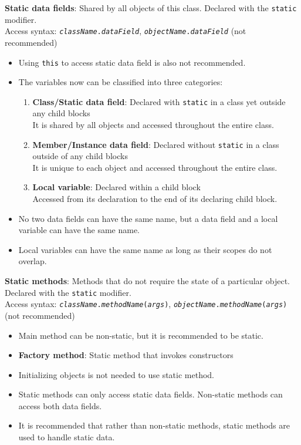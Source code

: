 \documentclass{article}
\begin{document}
\textbf{Static data fields}: Shared by all objects of this class. Declared with the \texttt{static} modifier.\\
Access syntax: \texttt{\textit{className}.\textit{dataField}}, \texttt{\textit{objectName}.\textit{dataField}} (not recommended)
\begin{itemize}
	\item Using \texttt{this} to access static data field is also not recommended.
	\item The variables now can be classified into three categories:
	\begin{enumerate}
		\item \textbf{Class/Static data field}: Declared with \texttt{static} in a class yet outside any child blocks\\
		It is shared by all objects and accessed throughout the entire class.
		\item \textbf{Member/Instance data field}: Declared without \texttt{static} in a class outside of any child blocks\\
		It is unique to each object and accessed throughout the entire class.
		\item \textbf{Local variable}: Declared within a child block\\
		Accessed from its declaration to the end of its declaring child block.
	\end{enumerate}
	\item No two data fields can have the same name, but a data field and a local variable can have the same name.
	\item Local variables can have the same name as long as their scopes do not overlap.
\end{itemize}
\textbf{Static methods}: Methods that do not require the state of a particular object. Declared with the \texttt{static} modifier.\\
Access syntax: \texttt{\textit{className}.\textit{methodName}(\textit{args})}, \texttt{\textit{objectName}.\textit{methodName}(\textit{args})} (not recommended)
\begin{itemize}
	\item Main method can be non-static, but it is recommended to be static. 
	\item \textbf{Factory method}: Static method that invokes constructors
	\item Initializing objects is not needed to use static method.
	\item Static methods can only access static data fields. Non-static methods can access both data fields.
	\item It is recommended that rather than non-static methods, static methods are used to handle static data.
\end{itemize}
\end{document}
